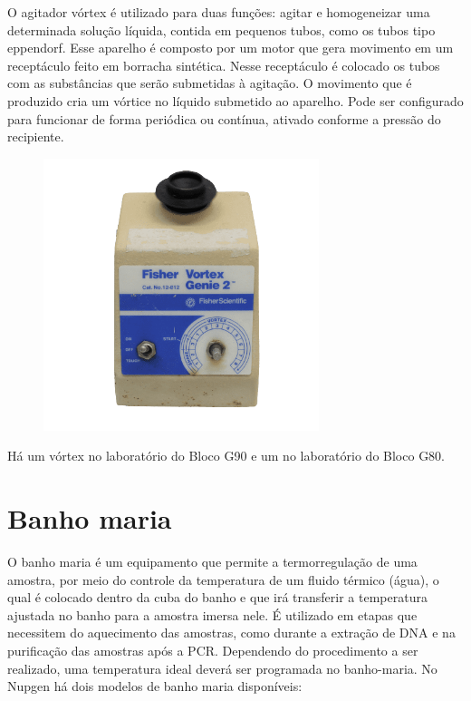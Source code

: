 \documentclass[
  letterpaper,
  DIV=11,
  numbers=noendperiod]{scrreprt}
\begin{document}
O agitador vórtex é utilizado para duas funções: agitar e homogeneizar
uma determinada solução líquida, contida em pequenos tubos, como os
tubos tipo eppendorf. Esse aparelho é composto por um motor que gera
movimento em um receptáculo feito em borracha sintética. Nesse
receptáculo é colocado os tubos com as substâncias que serão submetidas
à agitação. O movimento que é produzido cria um vórtice no líquido
submetido ao aparelho. Pode ser configurado para funcionar de forma
periódica ou contínua, ativado conforme a pressão do recipiente.

\begin{figure}

{\centering \includegraphics[width=\textwidth,height=3.125in]{figures/equipamentos/vortex.png}

}

\end{figure}

Há um vórtex no laboratório do Bloco G90 e um no laboratório do Bloco
G80.

\hypertarget{banho-maria}{%
\section{Banho maria}\label{banho-maria}}

O banho maria é um equipamento que permite a termorregulação de uma
amostra, por meio do controle da temperatura de um fluido térmico
(água), o qual é colocado dentro da cuba do banho e que irá transferir a
temperatura ajustada no banho para a amostra imersa nele. É utilizado em
etapas que necessitem do aquecimento das amostras, como durante a
extração de DNA e na purificação das amostras após a PCR. Dependendo do
procedimento a ser realizado, uma temperatura ideal deverá ser
programada no banho-maria. No Nupgen há dois modelos de banho maria
disponíveis:
\end{document}

